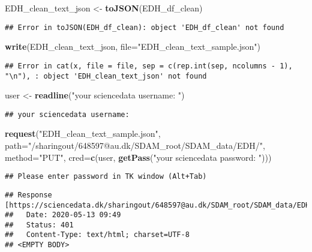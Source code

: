 \documentclass[]{article}
\newenvironment{Shaded}{\begin{snugshade}}{\end{snugshade}}
\newcommand{\DataTypeTok}[1]{\textcolor[rgb]{0.13,0.29,0.53}{#1}}
\newcommand{\KeywordTok}[1]{\textcolor[rgb]{0.13,0.29,0.53}{\textbf{#1}}}
\newcommand{\NormalTok}[1]{#1}
\newcommand{\StringTok}[1]{\textcolor[rgb]{0.31,0.60,0.02}{#1}}
\begin{document}
\begin{Shaded}
\begin{Highlighting}[]
\NormalTok{EDH_clean_text_json <-}\StringTok{ }\KeywordTok{toJSON}\NormalTok{(EDH_df_clean)}
\end{Highlighting}
\end{Shaded}

\begin{verbatim}
## Error in toJSON(EDH_df_clean): object 'EDH_df_clean' not found
\end{verbatim}

\begin{Shaded}
\begin{Highlighting}[]
\KeywordTok{write}\NormalTok{(EDH_clean_text_json, }\DataTypeTok{file=}\StringTok{"EDH_clean_text_sample.json"}\NormalTok{)}
\end{Highlighting}
\end{Shaded}

\begin{verbatim}
## Error in cat(x, file = file, sep = c(rep.int(sep, ncolumns - 1), "\n"), : object 'EDH_clean_text_json' not found
\end{verbatim}

\begin{Shaded}
\begin{Highlighting}[]
\NormalTok{user <-}\StringTok{ }\KeywordTok{readline}\NormalTok{(}\StringTok{"your sciencedata username: "}\NormalTok{)}
\end{Highlighting}
\end{Shaded}

\begin{verbatim}
## your sciencedata username:
\end{verbatim}

\begin{Shaded}
\begin{Highlighting}[]
\KeywordTok{request}\NormalTok{(}\StringTok{"EDH_clean_text_sample.json"}\NormalTok{, }\DataTypeTok{path=}\StringTok{"/sharingout/648597@au.dk/SDAM_root/SDAM_data/EDH/"}\NormalTok{, }
        \DataTypeTok{method=}\StringTok{"PUT"}\NormalTok{, }\DataTypeTok{cred=}\KeywordTok{c}\NormalTok{(user, }\KeywordTok{getPass}\NormalTok{(}\StringTok{"your sciencedata password: "}\NormalTok{))) }
\end{Highlighting}
\end{Shaded}

\begin{verbatim}
## Please enter password in TK window (Alt+Tab)
\end{verbatim}

\begin{verbatim}
## Response [https://sciencedata.dk/sharingout/648597@au.dk/SDAM_root/SDAM_data/EDH//EDH_clean_text_sample.json]
##   Date: 2020-05-13 09:49
##   Status: 401
##   Content-Type: text/html; charset=UTF-8
## <EMPTY BODY>
\end{verbatim}
\end{document}
